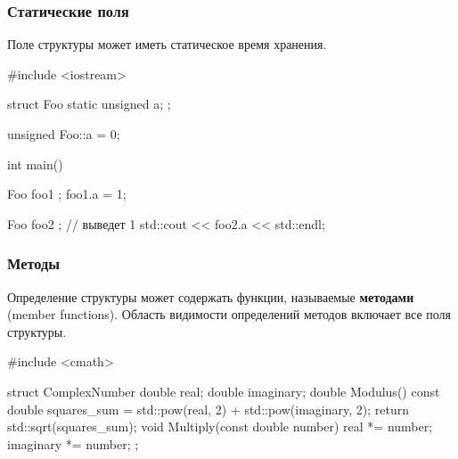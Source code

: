 \documentclass[compress, 8pt]{beamer}
\begin{document}
\begin{frame}[fragile]
\begin{columns}[T]
\begin{column}{0.4\textwidth}
        \end{column}

    \end{columns}

\end{frame}

\begin{frame}[fragile]

    \frametitle{Статические поля}

    Поле структуры может иметь статическое время хранения.

    \begin{myinplacelisting}[minted language=cpp]
#include <iostream>

struct Foo {
    static unsigned a;
};

unsigned Foo::a = 0;

int main() {
    Foo foo1 {};
    foo1.a = 1;

    Foo foo2 {};
    // выведет 1
    std::cout << foo2.a << std::endl;
}
    \end{myinplacelisting}

\end{frame}

\begin{frame}[fragile]

    \frametitle{Методы}

    \hfill\break
    Определение структуры может содержать функции, называемые
    \textbf{методами}\footnotemark{} (member functions).
    Область видимости определений методов включает все поля структуры.


    \begin{myinplacelisting}[minted language=cpp]
#include <cmath>

struct ComplexNumber {
    double real;
    double imaginary;
    double Modulus() {
        const double squares_sum =
            std::pow(real, 2) +
            std::pow(imaginary, 2);
        return std::sqrt(squares_sum);
    }
    void Multiply(const double number) {
        real *= number;
        imaginary *= number;
    }
};
    \end{myinplacelisting}

\end{frame}
\end{document}

